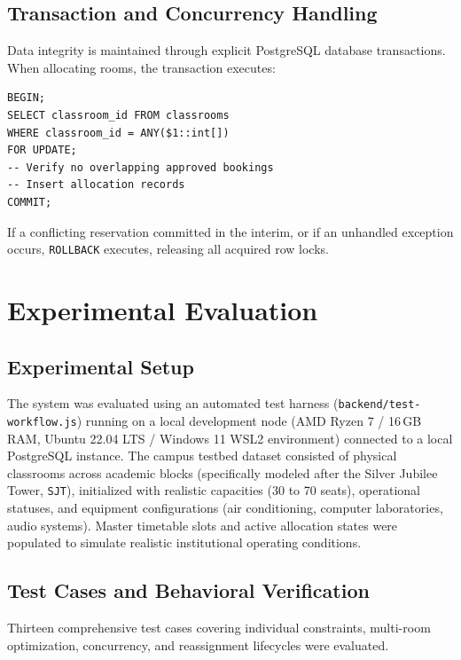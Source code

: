 \documentclass[conference]{IEEEtran}
\begin{document}
\subsection{Transaction and Concurrency Handling}
Data integrity is maintained through explicit PostgreSQL database transactions. When allocating rooms, the transaction executes:
\begin{verbatim}
BEGIN;
SELECT classroom_id FROM classrooms 
WHERE classroom_id = ANY($1::int[]) 
FOR UPDATE;
-- Verify no overlapping approved bookings
-- Insert allocation records
COMMIT;
\end{verbatim}
If a conflicting reservation committed in the interim, or if an unhandled exception occurs, \texttt{ROLLBACK} executes, releasing all acquired row locks.

\section{Experimental Evaluation}

\subsection{Experimental Setup}
The system was evaluated using an automated test harness (\texttt{backend/test-workflow.js}) running on a local development node (AMD Ryzen 7 / 16\,GB RAM, Ubuntu 22.04 LTS / Windows 11 WSL2 environment) connected to a local PostgreSQL instance. The campus testbed dataset consisted of physical classrooms across academic blocks (specifically modeled after the Silver Jubilee Tower, \texttt{SJT}), initialized with realistic capacities (30 to 70 seats), operational statuses, and equipment configurations (air conditioning, computer laboratories, audio systems). Master timetable slots and active allocation states were populated to simulate realistic institutional operating conditions.

\subsection{Test Cases and Behavioral Verification}
Thirteen comprehensive test cases covering individual constraints, multi-room optimization, concurrency, and reassignment lifecycles were evaluated.
\end{document}
